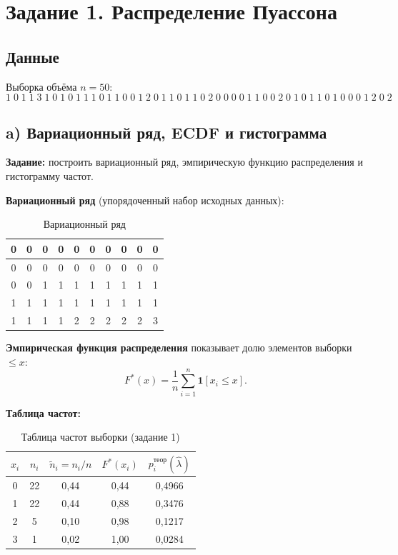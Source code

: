 \documentclass[12pt,a4paper]{article}
\begin{document}
	\tableofcontents
	\newpage
	
	\section{Задание 1. Распределение Пуассона}
	
	\subsection*{Данные}
	Выборка объёма $n = 50$:
	\[
	1\;0\;1\;1\;3\;1\;0\;1\;0\;1\;1\;1\;0\;1\;1\;0\;0\;1\;2\;0\;
	1\;1\;0\;1\;1\;0\;2\;0\;0\;0\;0\;1\;1\;0\;0\;2\;0\;1\;0\;1\;
	1\;0\;1\;0\;0\;0\;1\;2\;0\;2
	\]
	
	\subsection{a) Вариационный ряд, ECDF и гистограмма}
		
		\textbf{Задание:} построить вариационный ряд, эмпирическую функцию распределения
		и гистограмму частот.
	
	\textbf{Вариационный ряд} (упорядоченный набор исходных данных):
	
	\begin{table}[H]
		\centering
		\begin{tabular}{|c|c|c|c|c|c|c|c|c|c|}
			\hline
			0&0&0&0&0&0&0&0&0&0\\
			\hline
			0&0&0&0&0&0&0&0&0&0\\
			\hline
			0&0&1&1&1&1&1&1&1&1\\
			\hline
			1&1&1&1&1&1&1&1&1&1\\
			\hline
			1&1&1&1&2&2&2&2&2&3\\
			\hline
		\end{tabular}
		\caption{Вариационный ряд}
	\end{table}
	
	\textbf{Эмпирическая функция распределения} показывает долю элементов выборки $\le x$:
	\[
	F^*(x) = \frac{1}{n}\sum_{i=1}^{n}\mathbf{1}[x_i \le x].
	\]
	
	\textbf{Таблица частот:}
	
	\begin{table}[H]
		\centering
		\begin{tabular}{ccccc}
			\toprule
			$x_i$ & $n_i$ & $\tilde{n}_i = n_i/n$ & $F^*(x_i)$ & $p_i^{\text{теор}}(\hat\lambda)$ \\
			\midrule
			0 & 22 & 0{,}44 & 0{,}44 & 0{,}4966 \\
			1 & 22 & 0{,}44 & 0{,}88 & 0{,}3476 \\
			2 &  5 & 0{,}10 & 0{,}98 & 0{,}1217 \\
			3 &  1 & 0{,}02 & 1{,}00 & 0{,}0284 \\
			\bottomrule
		\end{tabular}
		\caption{Таблица частот выборки (задание 1)}
	\end{table}
	
\end{document}
